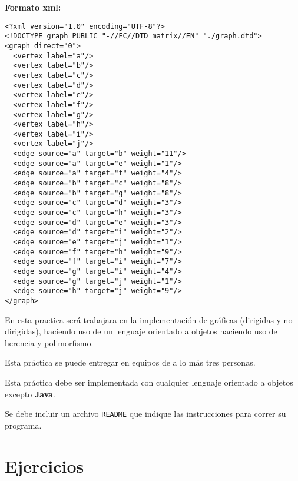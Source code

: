 \documentclass{article}
\begin{document}
\textbf{Formato xml:}
\begin{verbatim}
<?xml version="1.0" encoding="UTF-8"?>
<!DOCTYPE graph PUBLIC "-//FC//DTD matrix//EN" "./graph.dtd">
<graph direct="0">
  <vertex label="a"/>
  <vertex label="b"/>	
  <vertex label="c"/>
  <vertex label="d"/>
  <vertex label="e"/>
  <vertex label="f"/>
  <vertex label="g"/>
  <vertex label="h"/>
  <vertex label="i"/>
  <vertex label="j"/>
  <edge source="a" target="b" weight="11"/>
  <edge source="a" target="e" weight="1"/>
  <edge source="a" target="f" weight="4"/>
  <edge source="b" target="c" weight="8"/>
  <edge source="b" target="g" weight="8"/>
  <edge source="c" target="d" weight="3"/>
  <edge source="c" target="h" weight="3"/>
  <edge source="d" target="e" weight="3"/>
  <edge source="d" target="i" weight="2"/>
  <edge source="e" target="j" weight="1"/>
  <edge source="f" target="h" weight="9"/>
  <edge source="f" target="i" weight="7"/>
  <edge source="g" target="i" weight="4"/>
  <edge source="g" target="j" weight="1"/>
  <edge source="h" target="j" weight="9"/>
</graph>
\end{verbatim}

En esta practica será trabajara en la implementación de gráficas (dirigidas y no dirigidas), haciendo uso de un lenguaje orientado a objetos haciendo uso de herencia y polimorfismo.

Esta práctica se puede entregar en equipos de a lo más tres personas.

Esta práctica debe ser implementada con cualquier lenguaje orientado a objetos excepto \textbf{Java}.

Se debe incluir un archivo \texttt{README} que indique las instrucciones para correr su programa.

\section{Ejercicios}
\end{document}
